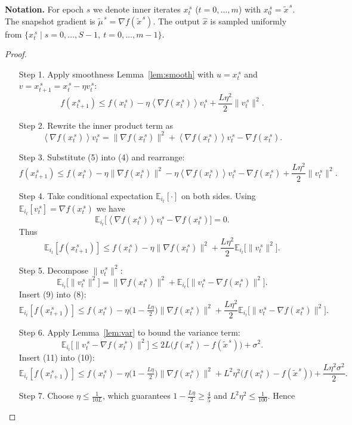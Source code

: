 \documentclass[11pt]{article}
\newcommand{\EE}{\mathbb{E}}
\newcommand{\inner}[1]{\left\langle #1\right\rangle}
\newcommand{\grad}{\nabla}
\begin{document}
\noindent\textbf{Notation.} For epoch $s$ we denote inner iterates $x_t^{\,s}$ ($t=0,\dots,m$) with $x_0^{\,s}=\tilde{x}^{\,s}$. The snapshot gradient is $\tilde\mu^{\,s}=\grad f(\tilde{x}^{\,s})$. The output $\hat{x}$ is sampled uniformly from $\{x_t^{\,s}\mid s=0,\dots,S-1,\ t=0,\dots,m-1\}$.

\begin{proof}
\begin{enumerate}
\item[Step 1.] Apply smoothness Lemma~\ref{lem:smooth} with $u=x_t^{\,s}$ and $v=x_{t+1}^{\,s}=x_t^{\,s}-\eta v_t^{\,s}$:
\[
f(x_{t+1}^{\,s})\le f(x_t^{\,s})-\eta\inner{\grad f(x_t^{\,s})}{v_t^{\,s}}+\frac{L\eta^{2}}{2}\|v_t^{\,s}\|^{2}.
\tag{4}
\]
\item[Step 2.] Rewrite the inner product term as
\[
\inner{\grad f(x_t^{\,s})}{v_t^{\,s}}
=\|\grad f(x_t^{\,s})\|^{2}
+\inner{\grad f(x_t^{\,s})}{v_t^{\,s}-\grad f(x_t^{\,s})}.
\tag{5}
\]
\item[Step 3.] Substitute (5) into (4) and rearrange:
\[
f(x_{t+1}^{\,s})\le f(x_t^{\,s})
-\eta\|\grad f(x_t^{\,s})\|^{2}
-\eta\inner{\grad f(x_t^{\,s})}{v_t^{\,s}-\grad f(x_t^{\,s})}
+\frac{L\eta^{2}}{2}\|v_t^{\,s}\|^{2}.
\tag{6}
\]
\item[Step 4.] Take conditional expectation $\EE_{i_t}[\cdot]$ on both sides. Using $\EE_{i_t}[v_t^{\,s}]=\grad f(x_t^{\,s})$ we have
\[
\EE_{i_t}\!\big[\inner{\grad f(x_t^{\,s})}{v_t^{\,s}-\grad f(x_t^{\,s})}\big]=0.
\tag{7}
\]
Thus
\[
\EE_{i_t}[f(x_{t+1}^{\,s})]\le f(x_t^{\,s})
-\eta\|\grad f(x_t^{\,s})\|^{2}
+\frac{L\eta^{2}}{2}\EE_{i_t}\!\big[\|v_t^{\,s}\|^{2}\big].
\tag{8}
\]
\item[Step 5.] Decompose $\|v_t^{\,s}\|^{2}$:
\[
\EE_{i_t}\!\big[\|v_t^{\,s}\|^{2}\big]
=\|\grad f(x_t^{\,s})\|^{2}
+\EE_{i_t}\!\big[\|v_t^{\,s}-\grad f(x_t^{\,s})\|^{2}\big].
\tag{9}
\]
Insert (9) into (8):
\[
\EE_{i_t}[f(x_{t+1}^{\,s})]\le f(x_t^{\,s})
-\eta\big(1-\tfrac{L\eta}{2}\big)\|\grad f(x_t^{\,s})\|^{2}
+\frac{L\eta^{2}}{2}\EE_{i_t}\!\big[\|v_t^{\,s}-\grad f(x_t^{\,s})\|^{2}\big].
\tag{10}
\]
\item[Step 6.] Apply Lemma~\ref{lem:var} to bound the variance term:
\[
\EE_{i_t}\!\big[\|v_t^{\,s}-\grad f(x_t^{\,s})\|^{2}\big]
\le 2L\big(f(x_t^{\,s})-f(\tilde{x}^{\,s})\big)+\sigma^{2}.
\tag{11}
\]
Insert (11) into (10):
\[
\EE_{i_t}[f(x_{t+1}^{\,s})]\le
f(x_t^{\,s})
-\eta\big(1-\tfrac{L\eta}{2}\big)\|\grad f(x_t^{\,s})\|^{2}
+L^{2}\eta^{2}\big(f(x_t^{\,s})-f(\tilde{x}^{\,s})\big)
+\frac{L\eta^{2}\sigma^{2}}{2}.
\tag{12}
\]
\item[Step 7.] Choose $\eta\le\frac{1}{10L}$, which guarantees $1-\frac{L\eta}{2}\ge\frac{4}{5}$ and $L^{2}\eta^{2}\le\frac{1}{100}$. Hence

\end{enumerate}
\end{proof}
\end{document}
